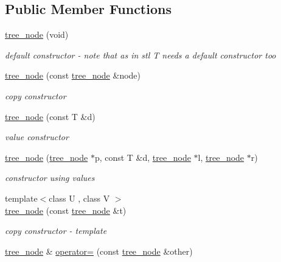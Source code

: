 \subsection*{Public Member Functions}
\begin{DoxyCompactItemize}
\item 
\hyperlink{structcrap_1_1tree__node_aa7925bedc87d21a0da8488ca6b910c35}{tree\-\_\-node} (void)
\begin{DoxyCompactList}\small\item\em default constructor -\/ note that as in stl T needs a default constructor too \end{DoxyCompactList}\item 
\hyperlink{structcrap_1_1tree__node_a68f5614a10fb41b26d73d44242f85be4}{tree\-\_\-node} (const \hyperlink{structcrap_1_1tree__node}{tree\-\_\-node} \&node)
\begin{DoxyCompactList}\small\item\em copy constructor \end{DoxyCompactList}\item 
\hyperlink{structcrap_1_1tree__node_a057d73ddebbaafa6dc9cd3070f8db4f5}{tree\-\_\-node} (const T \&d)
\begin{DoxyCompactList}\small\item\em value constructor \end{DoxyCompactList}\item 
\hyperlink{structcrap_1_1tree__node_ac151476181c25971d91b21c05448ccfa}{tree\-\_\-node} (\hyperlink{structcrap_1_1tree__node}{tree\-\_\-node} $\ast$p, const T \&d, \hyperlink{structcrap_1_1tree__node}{tree\-\_\-node} $\ast$l, \hyperlink{structcrap_1_1tree__node}{tree\-\_\-node} $\ast$r)
\begin{DoxyCompactList}\small\item\em constructor using values \end{DoxyCompactList}\item 
{\footnotesize template$<$class U , class V $>$ }\\\hyperlink{structcrap_1_1tree__node_acf20be376fbec0c6ab2ba96ee2b7bbbd}{tree\-\_\-node} (const \hyperlink{structcrap_1_1tree__node}{tree\-\_\-node} \&t)
\begin{DoxyCompactList}\small\item\em copy constructor -\/ template \end{DoxyCompactList}\item 
\hyperlink{structcrap_1_1tree__node}{tree\-\_\-node} \& \hyperlink{structcrap_1_1tree__node_acbcd1135c5a23f0345326e8cef3020a7}{operator=} (const \hyperlink{structcrap_1_1tree__node}{tree\-\_\-node} \&other)

\end{DoxyCompactItemize}
